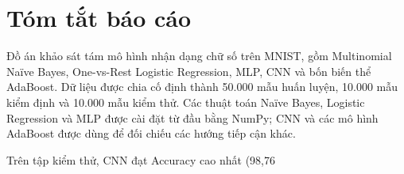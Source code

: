 \section*{Tóm tắt báo cáo}

Đồ án khảo sát tám mô hình nhận dạng chữ số trên MNIST, gồm Multinomial Naïve Bayes, One-vs-Rest Logistic Regression, MLP, CNN và bốn biến thể AdaBoost. Dữ liệu được chia cố định thành 50.000 mẫu huấn luyện, 10.000 mẫu kiểm định và 10.000 mẫu kiểm thử. Các thuật toán Naïve Bayes, Logistic Regression và MLP được cài đặt từ đầu bằng NumPy; CNN và các mô hình AdaBoost được dùng để đối chiếu các hướng tiếp cận khác.

Trên tập kiểm thử, CNN đạt Accuracy cao nhất (98,76%
